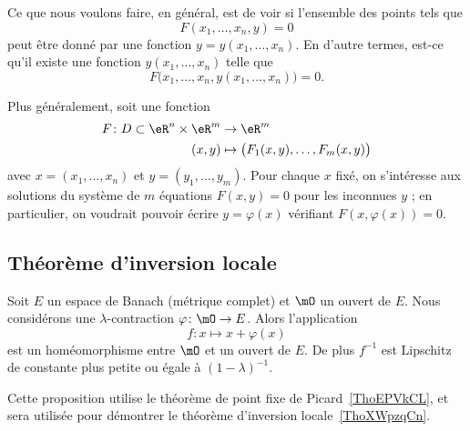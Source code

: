 Ce que nous voulons faire, en général, est de voir si l'ensemble des points tels que
\begin{equation}
	F(x_1,\ldots,x_n,y)=0
\end{equation}
peut être donné par une fonction \( y=y(x_1,\ldots,x_n)\). En d'autre termes, est-ce qu'il existe une fonction \( y(x_1,\ldots,x_n)\) telle que
\begin{equation}
	F\big( x_1,\ldots,x_n,y(x_1,\ldots,x_n)\big)=0.
\end{equation}

Plus généralement, soit une fonction
\begin{equation}
	\begin{aligned}
		F\colon D\subset \eR^n\times \eR^m & \to \eR^m                                     \\
		(x,y)                              & \mapsto \big( F_1(x,y),\ldots, F_m(x,y) \big)
	\end{aligned}
\end{equation}
avec \( x = (x_1,\ldots, x_n)\) et \( y = (y_1,\ldots,y_m)\). Pour chaque \( x\) fixé, on s'intéresse aux solutions du système de \( m\) équations \( F(x,y) = 0\) pour les inconnues \( y\) ; en particulier, on voudrait pouvoir écrire \( y = \varphi(x)\) vérifiant \( F(x,\varphi(x)) = 0\).

\subsection{Théorème d'inversion locale}

\begin{lemma} \label{LemGZoqknC}
	Soit \( E\) un espace de Banach (métrique complet) et \( \mO\) un ouvert de \( E\). Nous considérons une \( \lambda\)-contraction \( \varphi\colon \mO\to E\). Alors l'application
	\begin{equation}
		f\colon x \mapsto x+\varphi(x)
	\end{equation}
	est un homéomorphisme entre \( \mO\) et un ouvert de \( E\). De plus \( f^{-1}\) est Lipschitz de constante plus petite ou égale à \( (1-\lambda)^{-1}\).
\end{lemma}
Cette proposition utilise le théorème de point fixe de Picard~\ref{ThoEPVkCL}, et sera utilisée pour démontrer le théorème d'inversion locale~\ref{ThoXWpzqCn}.

